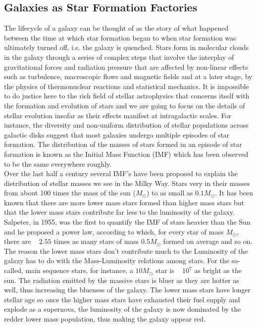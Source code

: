 \subsection{Galaxies as Star Formation Factories}

The lifecycle of a galaxy can be thought of as the story of what happened between the time at which star formation began to when star formation was ultimately turned off, i.e. the galaxy is quenched. Stars form in molecular clouds in the galaxy through a series of complex steps that involve the interplay of gravitational forces and radiation pressure that are affected by non-linear effects such as turbulence, macroscopic flows and magnetic fields and at a later stage, by the physics of thermonuclear reactions and statistical mechanics. It is impossible to do justice here to the rich field of stellar astrophysics that concerns itself with the formation and evolution of stars and we are going to focus on the details of stellar evolution insofar as their effects manifest at intragalactic scales. For instance, the diversity and non-uniform distribution of stellar populations across galactic disks suggest that most galaxies undergo multiple episodes of star formation. The distribution of the masses of stars formed in an episode of star formation is known as the Initial Mass Function (IMF) which has been observed to be the same everywhere roughly.\\

Over the last half a century several IMF's have been proposed to explain the distribution of stellar masses we see in the Milky Way. Stars very in their masses from about 100 times the mass of the sun ($M_{\odot}$) to as small as $0.1M_{\odot}$. It has been known that there are more lower mass stars formed than higher mass stars but that the lower mass stars contribute far less to the luminosity of the galaxy. Salpeter, in 1955, was the first to quantify the IMF \citep{1955ApJ...121..161S} of stars heavier than the Sun and he proposed a power law, according to which, for every star of mass $M_{\odot}$, there are ~ $2.55$ times as many stars of mass $0.5M_{\odot}$  formed on average and so on. The reason the lower mass stars don't contribute much to the Luminosity of the galaxy has to do with the Mass-Luminosity relations among stars. For the so-called, main sequence stars, for instance, a $10M_{\odot}$ star is ~ $10^{7}$ as bright as the sun. The radiation emitted by the massive stars is bluer as they are hotter as well, thus increasing the blueness of the galaxy. The lower mass stars have longer stellar age so once the higher mass stars have exhausted their fuel supply and explode as a supernova, the luminosity of the galaxy is now dominated by the redder lower mass population, thus making the galaxy appear red.\\

